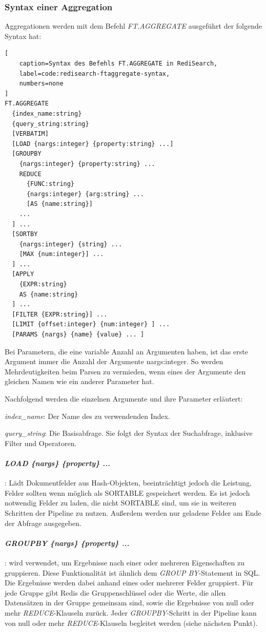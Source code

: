 \subsubsection{Syntax einer Aggregation}\label{sec:redisearch-aggregation-syntax}
Aggregationen werden mit dem Befehl \emph{FT.AGGREGATE} ausgeführt der folgende Syntax hat:
\begin{lstlisting}[
    caption=Syntax des Befehls FT.AGGREGATE in RediSearch,
    label=code:redisearch-ftaggregate-syntax,
    numbers=none
]
FT.AGGREGATE
  {index_name:string}
  {query_string:string}
  [VERBATIM]
  [LOAD {nargs:integer} {property:string} ...]
  [GROUPBY
    {nargs:integer} {property:string} ...
    REDUCE
      {FUNC:string}
      {nargs:integer} {arg:string} ...
      [AS {name:string}]
    ...
  ] ...
  [SORTBY
    {nargs:integer} {string} ...
    [MAX {num:integer}] ...
  ] ...
  [APPLY
    {EXPR:string}
    AS {name:string}
  ] ...
  [FILTER {EXPR:string}] ...
  [LIMIT {offset:integer} {num:integer} ] ...
  [PARAMS {nargs} {name} {value} ... ]
\end{lstlisting}

Bei Parametern, die eine variable Anzahl an Argumenten haben, ist das erste Argument immer die Anzahl der Argumente {nargs:integer}. So werden Mehrdeutigkeiten beim Parsen zu vermieden, wenn eines der Argumente den gleichen Namen wie ein anderer Parameter hat.

Nachfolgend werden die einzelnen Argumente und ihre Parameter erläutert:

\emph{index\_name}: Der Name des zu verwendenden Index.

\emph{query\_string}: Die Basisabfrage. Sie folgt der Syntax der Suchabfrage, inklusive Filter und Operatoren.

\paragraph{\emph{LOAD \{nargs\} \{property\} ...}}: Lädt Dokumentfelder aus Hash-Objekten, beeinträchtigt jedoch die Leistung, Felder sollten wenn möglich als SORTABLE gespeichert werden. Es ist jedoch notwendig Felder zu laden, die nicht SORTABLE sind, um sie in weiteren Schritten der Pipeline zu nutzen. Außerdem werden nur geladene Felder am Ende der Abfrage ausgegeben.

\paragraph{\emph{GROUPBY \{nargs\} \{property\} ...}}: wird verwendet, um Ergebnisse nach einer oder mehreren Eigenschaften zu gruppieren. Diese Funktionalität ist ähnlich dem \emph{GROUP BY}-Statement in SQL. Die Ergebnisse werden dabei anhand eines oder mehrerer Felder gruppiert. Für jede Gruppe gibt Redis die Gruppenschlüssel oder die Werte, die allen Datensätzen in der Gruppe gemeinsam sind, sowie die Ergebnisse von null oder mehr \emph{REDUCE}-Klauseln zurück. Jeder \emph{GROUPBY}-Schritt in der Pipeline kann von null oder mehr \emph{REDUCE}-Klauseln begleitet werden (siehe nächsten Punkt).

